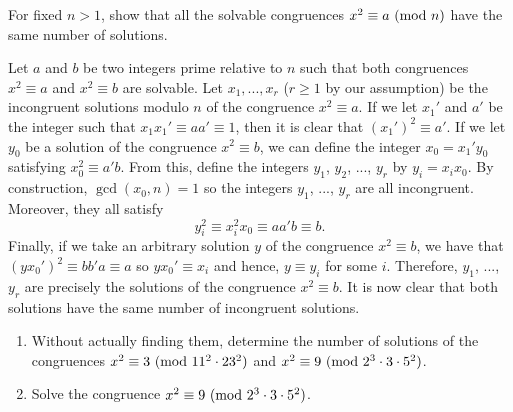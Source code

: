 \begin{exercise}
    For fixed $n > 1$, show that all the solvable congruences $x^2 \equiv a \ (\mathrm{mod}\ n)$ have the same number of solutions. \\
\end{exercise}

\begin{solution}
    Let $a$ and $b$ be two integers prime relative to $n$ such that both congruences $x^2 \equiv a$ and $x^2 \equiv b$ are solvable. Let $x_1, ..., x_r$ ($r \geq 1$ by our assumption) be the incongruent solutions modulo $n$ of the congruence $x^2 \equiv a$. If we let $x_1'$ and $a'$ be the integer such that $x_1x_1' \equiv aa' \equiv 1$, then it is clear that $(x_1')^2 \equiv a'$. If we let $y_0$ be a solution of the congruence $x^2 \equiv b$, we can define the integer $x_0 = x_1'y_0$ satisfying $x_0^2 \equiv a'b$. From this, define the integers $y_1$, $y_2$, ..., $y_r$ by $y_i = x_i x_0$. By construction, $\gcd(x_0, n) = 1$ so the integers $y_1$, ..., $y_r$ are all incongruent. Moreover, they all satisfy
    $$y_i^2 \equiv x_i^2x_0 \equiv aa'b \equiv b.$$
    Finally, if we take an arbitrary solution $y$ of the congruence $x^2 \equiv b$, we have that $(yx_0')^2 \equiv bb'a \equiv a$ so $yx_0' \equiv x_i$ and hence, $y \equiv y_i$ for some $i$. Therefore, $y_1$, ..., $y_r$ are precisely the solutions of the congruence $x^2 \equiv b$. It is now clear that both solutions have the same number of incongruent solutions. \\
\end{solution}

\begin{exercise}
    \begin{enumerate}
        \item Without actually finding them, determine the number of solutions of the congruences $x^2 \equiv 3 \ (\mathrm{mod}\ 11^2 \cdot 23^2)$ and $x^2 \equiv 9 \ (\mathrm{mod}\ 2^3 \cdot 3\cdot 5^2)$.
        \item Solve the congruence $x^2 \equiv 9 \ (\mathrm{mod}\ 2^3 \cdot 3\cdot 5^2)$.\\
    \end{enumerate}
\end{exercise}

